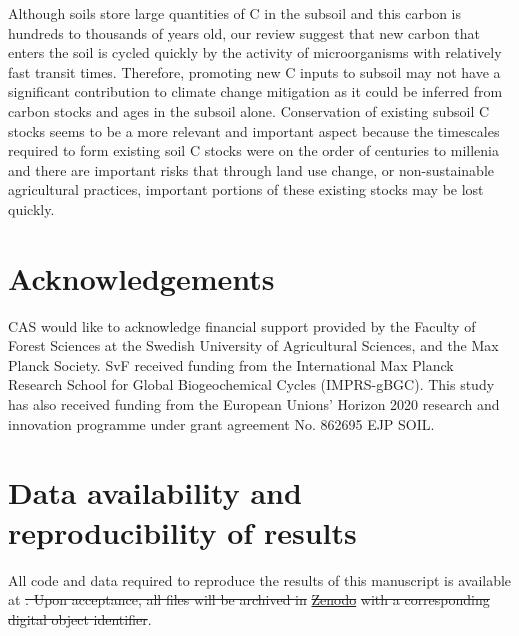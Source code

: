 \documentclass[11pt, oneside, a4paper]{article}   	%
\providecommand{\DIFaddtex}[1]{{\protect\color{blue}\uwave{#1}}} %
\providecommand{\DIFdeltex}[1]{{\protect\color{red}\sout{#1}}}                      %
\providecommand{\DIFaddbegin}{} %
\providecommand{\DIFaddend}{} %
\providecommand{\DIFdelbegin}{} %
\providecommand{\DIFdelend}{} %
\providecommand{\DIFadd}[1]{\texorpdfstring{\DIFaddtex{#1}}{#1}} %
\providecommand{\DIFdel}[1]{\texorpdfstring{\DIFdeltex{#1}}{}} %
\newcommand{\DIFscaledelfig}{0.5}
\newlength{\DIFdelgraphicswidth} %
\newlength{\DIFdelgraphicsheight} %
\newcommand{\DIFaddincludegraphics}[2][]{{\color{blue}\fbox{\DIFOincludegraphics[#1]{#2}}}} %
\newcommand{\DIFdelincludegraphics}[2][]{%
\sbox{\DIFdelgraphicsbox}{\DIFOincludegraphics[#1]{#2}}%
\settoboxwidth{\DIFdelgraphicswidth}{\DIFdelgraphicsbox} %
\settoboxtotalheight{\DIFdelgraphicsheight}{\DIFdelgraphicsbox} %
\scalebox{\DIFscaledelfig}{%
\parbox[b]{\DIFdelgraphicswidth}{\usebox{\DIFdelgraphicsbox}\\[-\baselineskip] \rule{\DIFdelgraphicswidth}{0em}}\llap{\resizebox{\DIFdelgraphicswidth}{\DIFdelgraphicsheight}{%
\setlength{\unitlength}{\DIFdelgraphicswidth}%
\begin{picture}(1,1)%
\thicklines\linethickness{2pt} %
{\color[rgb]{1,0,0}\put(0,0){\framebox(1,1){}}}%
{\color[rgb]{1,0,0}\put(0,0){\line( 1,1){1}}}%
{\color[rgb]{1,0,0}\put(0,1){\line(1,-1){1}}}%
\end{picture}%
}\hspace*{3pt}}} %
} %
\DeclareRobustCommand{\DIFaddbegin}{\DIFOaddbegin \let\includegraphics\DIFaddincludegraphics} %
\DeclareRobustCommand{\DIFaddend}{\DIFOaddend \let\includegraphics\DIFOincludegraphics} %
\DeclareRobustCommand{\DIFdelbegin}{\DIFOdelbegin \let\includegraphics\DIFdelincludegraphics} %
\DeclareRobustCommand{\DIFdelend}{\DIFOaddend \let\includegraphics\DIFOincludegraphics} %
\begin{document}
Although soils store large quantities of C in the subsoil and this carbon is hundreds to thousands of years old, our review suggest that new carbon that enters the soil is cycled quickly by the activity of microorganisms with relatively fast transit times. Therefore, promoting new C inputs to subsoil may not have a significant contribution to climate change mitigation as it could be inferred from carbon stocks and ages in the subsoil alone. Conservation of existing subsoil C stocks seems to be a more relevant and important aspect because the timescales required to form existing soil C stocks were on the order of centuries to millenia and there are important risks that through land use change, or non-sustainable agricultural practices, important portions of these existing stocks may be lost quickly. 

\section*{Acknowledgements}
CAS would like to acknowledge financial support provided by the Faculty of Forest Sciences at the Swedish University of Agricultural Sciences, and the Max Planck Society. SvF received funding from the International Max Planck Research School for Global Biogeochemical Cycles (IMPRS-gBGC). This study has also received funding from the European Unions’ Horizon 2020 research and innovation programme under grant agreement No. 862695 EJP SOIL.

\section*{Data availability and reproducibility of results}
All code and data required to reproduce the results of this manuscript is available at \DIFdelbegin %
\DIFdel{. Upon acceptance, all files will be archived in }\href{https://zenodo.org/}{\DIFdel{Zenodo}} %
\DIFdel{with a corresponding digital object identifier}\DIFdelend \DIFaddbegin \DIFadd{doi: 10.5281/zenodo.10457957}\DIFaddend . 




\end{document}
